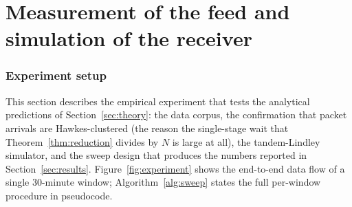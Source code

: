 \documentclass[11pt]{article}
\begin{document}


\clearpage
\part{Measurement of the feed and simulation of the receiver}

\section{Experiment setup}
\label{sec:experiment-setup}

This section describes the empirical experiment that tests the analytical predictions of
Section~\ref{sec:theory}: the data corpus, the confirmation that packet arrivals are
Hawkes-clustered (the reason the single-stage wait that Theorem~\ref{thm:reduction}
divides by $N$ is large at all), the tandem-Lindley simulator, and the sweep design that
produces the numbers reported in Section~\ref{sec:results}. Figure~\ref{fig:experiment}
shows the end-to-end data flow of a single 30-minute window; Algorithm~\ref{alg:sweep}
states the full per-window procedure in pseudocode.
\end{document}
